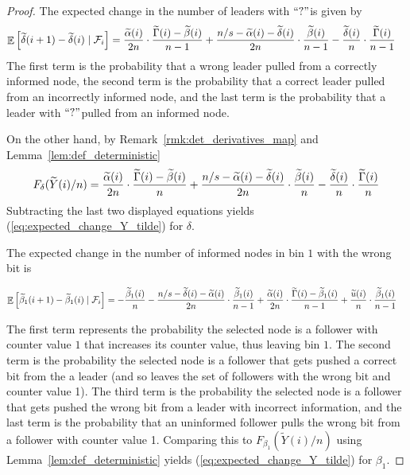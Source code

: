 \documentclass[a4paper,12pt]{article}
\newcommand{\q}{$``?"$}
\DeclareMathOperator{\Ex}{\mathbb{E}}%
\begin{document}
\begin{proof}
The expected change in the number of leaders with \q is given by
\begin{align}
\Ex\left[\widetilde{\delta}(i+1) - \widetilde{\delta}(i) \mid \mathcal{F}_i \right] & = \frac{\widetilde{\alpha}(i)}{2n} \cdot \frac{\widetilde{\Gamma}(i)-\widetilde{\beta}(i)}{n-1} + \frac{n/s - {\widetilde{\alpha}(i)} - {\widetilde{\delta}(i)}}{2n} \cdot \frac{\widetilde{\beta}(i)}{n-1} - \frac{\widetilde{\delta}(i)}{n} \cdot \frac{\widetilde{\Gamma}(i)}{n-1} \notag
\end{align}
The first term is the probability that a wrong leader pulled from a correctly informed node, the second term is the probability that a correct leader pulled from an incorrectly informed node, and the last term is the probability that a leader with \q pulled from an informed node.

\medskip

On the other hand, by Remark~\ref{rmk:det_derivatives_map} and Lemma~\ref{lem:def_deterministic}
\begin{align}
F_{\delta}(\widetilde{Y}(i)/n) = \frac{\widetilde{\alpha}(i)}{2n} \cdot \frac{\widetilde{\Gamma}(i)-\widetilde{\beta}(i)}{n}  + \frac{n/s - {\widetilde{\alpha}(i)} - {\widetilde{\delta}(i)}}{2n} \cdot \frac{\widetilde{\beta}(i)}{n} - \frac{\widetilde{\delta}(i)}{n} \cdot \frac{\widetilde{\Gamma}(i)}{n} \notag
\end{align}
Subtracting the last two displayed equations yields (\ref{eq:expected_change_Y_tilde}) for $\delta$.

The expected change in the number of informed nodes in bin $1$ with the wrong bit is
\begin{small}
	\begin{align}
	\Ex\left[\widetilde{\beta}_1(i+1) - \widetilde{\beta}_1(i) \mid \mathcal{F}_i \right] & = - \frac{\widetilde{\beta}_1(i)}{n}- \frac{n/s - \widetilde{\delta}(i) - \widetilde{\alpha}(i)}{2n} \cdot \frac{\widetilde{\beta}_1(i)}{n-1} + \frac{\widetilde{\alpha}(i)}{2n} \cdot \frac{\widetilde{\Gamma}(i) - \widetilde{\beta}_1(i)}{n-1}  + \frac{\widetilde{u}(i)}{n} \cdot \frac{\widetilde{\beta}_1(i)}{n-1} \notag
	\end{align}
\end{small}
The first term represents the probability the selected node is a follower with counter value $1$ that increases its counter value, thus leaving bin $1$. The second term is the probability the selected node is a follower that gets pushed a correct bit from the a leader (and so leaves the set of followers with the wrong bit and counter value 1). The third term is the probability the selected node is a follower that gets pushed the wrong bit from a leader with incorrect information, and the last term is the probability that an uninformed follower pulls the wrong bit from a follower with counter value 1. Comparing this to $F_{\beta_1}(\widetilde{Y}(i)/n)$ using Lemma~\ref{lem:def_deterministic} yields (\ref{eq:expected_change_Y_tilde}) for $\beta_1$.


\end{proof}
\end{document}
